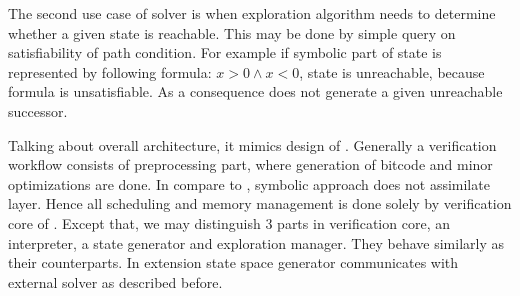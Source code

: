 The second use case of \SMT solver is when exploration algorithm needs to
determine whether a given state is reachable. This may be done by simple query
on satisfiability of path condition. For example if symbolic part of state is
represented by following formula: $x > 0 \wedge x < 0$, state is unreachable,
because formula is unsatisfiable. As a consequence \SymDIVINE does
not generate a given unreachable successor.

Talking about \SymDIVINE overall architecture, it mimics design of \DIVINE.
Generally a verification workflow consists of preprocessing part, where
generation of \LLVM bitcode and minor optimizations are done. In compare to
\DIVINE, symbolic approach does not assimilate \DIOS layer. Hence all scheduling
and memory management is done solely by verification core of \SymDIVINE. Except
that, we may distinguish 3 parts in verification core, an interpreter, a state
generator and exploration manager. They behave similarly as their \DIVINE
counterparts. In extension state space generator communicates with external
\SMT solver as described before.

